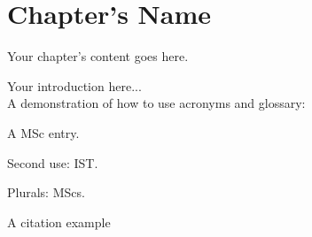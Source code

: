 
\chapter{Chapter's Name}
\label{chapter:chaptername}
Your chapter's content goes here.


Your introduction here...\\

A demonstration of how to use acronyms and glossary:

A \gls{MSc} entry.

Second use: \gls{IST}.

Plurals: \glspl{MSc}.

A citation example \cite{nobody}
